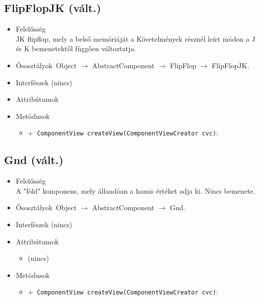 \subsection{FlipFlopJK (vált.)}
\begin{itemize}
\item Felelősség\\
JK flipflop, mely a belső memóriáját a Követelmények résznél leírt módon  a J és K bemenetektől függően változtatja.
\item Ősosztályok\ Object $\rightarrow{}$ AbstractComponent $\rightarrow{}$ FlipFlop $\rightarrow{}$ FlipFlopJK.
\item Interfészek (nincs)
\item Attribútumok $\ $
\item Metódusok$\ $
\begin{itemize}
	\item[] \texttt{$+$ ComponentView createView(ComponentViewCreator cvc)}: 
\end{itemize}
\end{itemize}

\subsection{Gnd (vált.)}
\begin{itemize}
\item Felelősség\\
A "föld" komponens, mely állandóan a hamis értéket adja ki. Nincs bemenete.
\item Ősosztályok\ Object $\rightarrow{}$ AbstractComponent $\rightarrow{}$ Gnd.
\item Interfészek (nincs)
\item Attribútumok $\ $
\begin{itemize}
\item (nincs)
\end{itemize}
\item Metódusok$\ $
\begin{itemize}
	\item[] \texttt{$+$ ComponentView createView(ComponentViewCreator cvc)}: 
\end{itemize}
\end{itemize}

